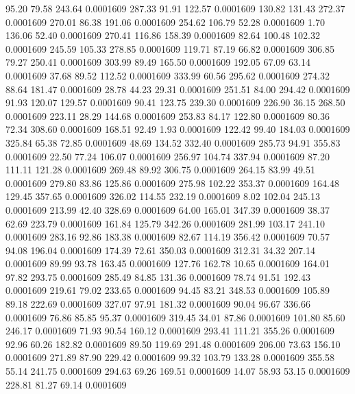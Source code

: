   95.20   79.58  243.64   0.0001609
 287.33   91.91  122.57   0.0001609
 130.82  131.43  272.37   0.0001609
 270.01   86.38  191.06   0.0001609
 254.62  106.79   52.28   0.0001609
   1.70  136.06   52.40   0.0001609
 270.41  116.86  158.39   0.0001609
  82.64  100.48  102.32   0.0001609
 245.59  105.33  278.85   0.0001609
 119.71   87.19   66.82   0.0001609
 306.85   79.27  250.41   0.0001609
 303.99   89.49  165.50   0.0001609
 192.05   67.09   63.14   0.0001609
  37.68   89.52  112.52   0.0001609
 333.99   60.56  295.62   0.0001609
 274.32   88.64  181.47   0.0001609
  28.78   44.23   29.31   0.0001609
 251.51   84.00  294.42   0.0001609
  91.93  120.07  129.57   0.0001609
  90.41  123.75  239.30   0.0001609
 226.90   36.15  268.50   0.0001609
 223.11   28.29  144.68   0.0001609
 253.83   84.17  122.80   0.0001609
  80.36   72.34  308.60   0.0001609
 168.51   92.49    1.93   0.0001609
 122.42   99.40  184.03   0.0001609
 325.84   65.38   72.85   0.0001609
  48.69  134.52  332.40   0.0001609
 285.73   94.91  355.83   0.0001609
  22.50   77.24  106.07   0.0001609
 256.97  104.74  337.94   0.0001609
  87.20  111.11  121.28   0.0001609
 269.48   89.92  306.75   0.0001609
 264.15   83.99   49.51   0.0001609
 279.80   83.86  125.86   0.0001609
 275.98  102.22  353.37   0.0001609
 164.48  129.45  357.65   0.0001609
 326.02  114.55  232.19   0.0001609
   8.02  102.04  245.13   0.0001609
 213.99   42.40  328.69   0.0001609
  64.00  165.01  347.39   0.0001609
  38.37   62.69  223.79   0.0001609
 161.84  125.79  342.26   0.0001609
 281.99  103.17  241.10   0.0001609
 283.16   92.86  183.38   0.0001609
  82.67  114.19  356.42   0.0001609
  70.57   94.08  196.04   0.0001609
 174.39   72.61  350.03   0.0001609
 312.31   34.32  207.14   0.0001609
  89.99   93.78  163.45   0.0001609
 127.76  162.78   10.65   0.0001609
 164.01   97.82  293.75   0.0001609
 285.49   84.85  131.36   0.0001609
  78.74   91.51  192.43   0.0001609
 219.61   79.02  233.65   0.0001609
  94.45   83.21  348.53   0.0001609
 105.89   89.18  222.69   0.0001609
 327.07   97.91  181.32   0.0001609
  90.04   96.67  336.66   0.0001609
  76.86   85.85   95.37   0.0001609
 319.45   34.01   87.86   0.0001609
 101.80   85.60  246.17   0.0001609
  71.93   90.54  160.12   0.0001609
 293.41  111.21  355.26   0.0001609
  92.96   60.26  182.82   0.0001609
  89.50  119.69  291.48   0.0001609
 206.00   73.63  156.10   0.0001609
 271.89   87.90  229.42   0.0001609
  99.32  103.79  133.28   0.0001609
 355.58   55.14  241.75   0.0001609
 294.63   69.26  169.51   0.0001609
  14.07   58.93   53.15   0.0001609
 228.81   81.27   69.14   0.0001609
